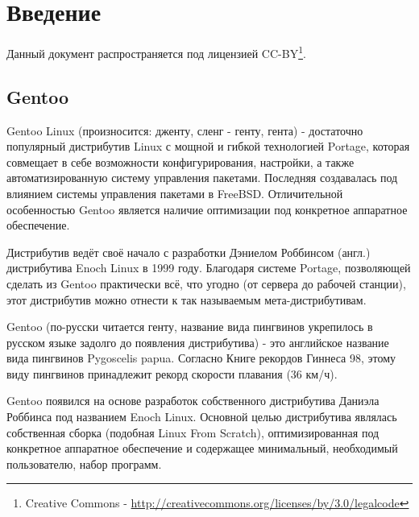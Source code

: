 \documentclass[12pt, a4paper]{article}
\begin{document}
\begin{titlepage}
\begin{center}
\vspace*{10cm}
{ \rm \Huge \textbf
	{
	}
}
\vfill 
{ \rm \large  {}  }
\end{center}
\end{titlepage}

\tableofcontents

\newpage

\section{Введение}

Данный документ распространяется под лицензией CC-BY\footnote{Creative Commons - \href{http://creativecommons.org/licenses/by/3.0/legalcode}{http://creativecommons.org/licenses/by/3.0/legalcode}}.

\subsection{Gentoo}

Gentoo Linux (произносится: дженту, сленг - генту, гента) - достаточно популярный дистрибутив Linux с мощной и гибкой технологией Portage, которая совмещает в себе возможности конфигурирования, настройки, а также автоматизированную систему управления пакетами. Последняя создавалась под влиянием системы управления пакетами в FreeBSD. Отличительной особенностью Gentoo является наличие оптимизации под конкретное аппаратное обеспечение.

Дистрибутив ведёт своё начало с разработки Дэниелом Роббинсом (англ.) дистрибутива Enoch Linux в 1999 году. Благодаря системе Portage, позволяющей сделать из Gentoo практически всё, что угодно (от сервера до рабочей станции), этот дистрибутив можно отнести к так называемым мета-дистрибутивам.

Gentoo (по-русски читается генту, название вида пингвинов укрепилось в русском языке задолго до появления дистрибутива) - это английское название вида пингвинов Pygoscelis papua. Согласно Книге рекордов Гиннеса 98, этому виду пингвинов принадлежит рекорд скорости плавания (36 км/ч).

Gentoo появился на основе разработок собственного дистрибутива Даниэла Роббинса под названием Enoch Linux. Основной целью дистрибутива являлась собственная сборка (подобная Linux From Scratch), оптимизированная под конкретное аппаратное обеспечение и содержащее минимальный, необходимый пользователю, набор программ.
\end{document}
